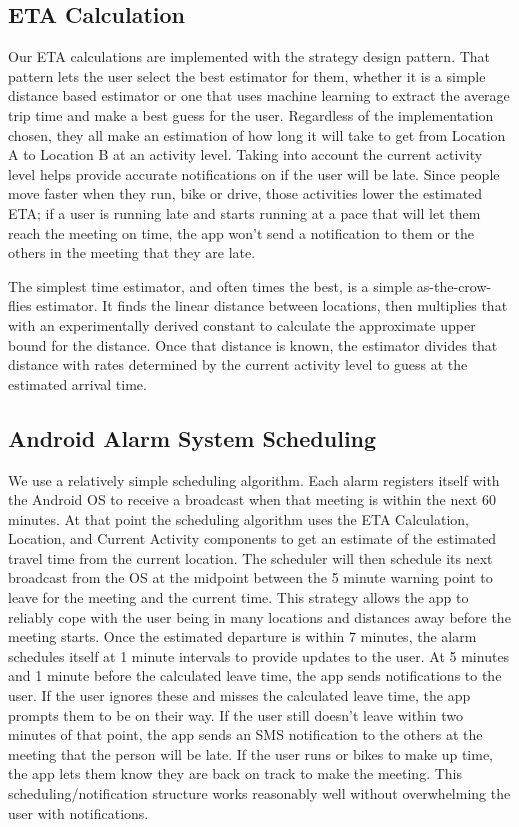 \subsection{ETA Calculation}
Our ETA calculations are implemented with the strategy design pattern.  That pattern lets the user select the best estimator for them, whether it is a simple distance based estimator or one that uses machine learning to extract the average trip time and make a best guess for the user. Regardless of the implementation chosen, they all make an estimation of how long it will take to get from Location A to Location B at an activity level. Taking into account the current activity level helps provide accurate notifications on if the user will be late. Since people move faster when they run, bike or drive, those activities lower the estimated ETA; if a user is running late and starts running at a pace that will let them reach the meeting on time, the app won't send a notification to them or the others in the meeting that they are late. 

The simplest time estimator, and often times the best, is a simple as-the-crow-flies estimator. It finds the linear distance between locations, then multiplies that with an experimentally derived constant to calculate the approximate upper bound for the distance.  Once that distance is known, the estimator divides that distance with rates determined by the current activity level to guess at the estimated arrival time.

\subsection{Android Alarm System Scheduling}
We use a relatively simple scheduling algorithm. Each alarm registers itself with the Android OS to receive a broadcast when that meeting is within the next 60 minutes. At that point the scheduling algorithm uses the ETA Calculation, Location, and Current Activity components to get an estimate of the estimated travel time from the current location. The scheduler will then schedule its next broadcast from the OS at the midpoint between the 5 minute warning point to leave for the meeting and the current time. This strategy allows the app to reliably cope with the user being in many locations and distances away before the meeting starts.  Once the estimated departure is within 7 minutes, the alarm schedules itself at 1 minute intervals to provide updates to the user. At 5 minutes and 1 minute before the calculated leave time, the app sends notifications to the user. If the user ignores these and misses the calculated leave time, the app prompts them to be on their way. If the user still doesn't leave within two minutes of that point, the app sends an SMS notification to the others at the meeting that the person will be late. If the user runs or bikes to make up time, the app lets them know they are back on track to make the meeting. This scheduling/notification structure works reasonably well without overwhelming the user with notifications.